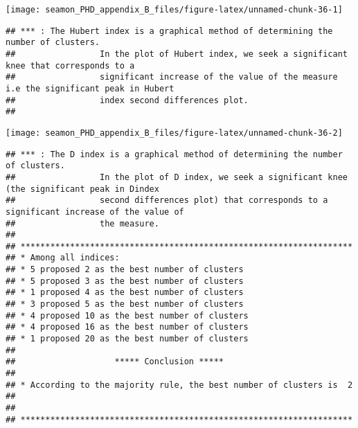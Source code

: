 \documentclass[]{article}
\newenvironment{Shaded}{\begin{snugshade}}{\end{snugshade}}
\newcommand{\CommentTok}[1]{\textcolor[rgb]{0.56,0.35,0.01}{\textit{#1}}}
\newcommand{\DataTypeTok}[1]{\textcolor[rgb]{0.13,0.29,0.53}{#1}}
\newcommand{\DecValTok}[1]{\textcolor[rgb]{0.00,0.00,0.81}{#1}}
\newcommand{\KeywordTok}[1]{\textcolor[rgb]{0.13,0.29,0.53}{\textbf{#1}}}
\newcommand{\NormalTok}[1]{#1}
\newcommand{\OperatorTok}[1]{\textcolor[rgb]{0.81,0.36,0.00}{\textbf{#1}}}
\newcommand{\OtherTok}[1]{\textcolor[rgb]{0.56,0.35,0.01}{#1}}
\newcommand{\StringTok}[1]{\textcolor[rgb]{0.31,0.60,0.02}{#1}}
\begin{document}
\begin{Shaded}
\end{Shaded}

\texttt{[image: seamon\_PHD\_appendix\_B\_files/figure-latex/unnamed-chunk-36-1]}

\begin{verbatim}
## *** : The Hubert index is a graphical method of determining the number of clusters.
##                 In the plot of Hubert index, we seek a significant knee that corresponds to a 
##                 significant increase of the value of the measure i.e the significant peak in Hubert
##                 index second differences plot. 
## 
\end{verbatim}

\texttt{[image: seamon\_PHD\_appendix\_B\_files/figure-latex/unnamed-chunk-36-2]}

\begin{verbatim}
## *** : The D index is a graphical method of determining the number of clusters. 
##                 In the plot of D index, we seek a significant knee (the significant peak in Dindex
##                 second differences plot) that corresponds to a significant increase of the value of
##                 the measure. 
##  
## ******************************************************************* 
## * Among all indices:                                                
## * 5 proposed 2 as the best number of clusters 
## * 5 proposed 3 as the best number of clusters 
## * 1 proposed 4 as the best number of clusters 
## * 3 proposed 5 as the best number of clusters 
## * 4 proposed 10 as the best number of clusters 
## * 4 proposed 16 as the best number of clusters 
## * 1 proposed 20 as the best number of clusters 
## 
##                    ***** Conclusion *****                            
##  
## * According to the majority rule, the best number of clusters is  2 
##  
##  
## *******************************************************************
\end{verbatim}
\end{document}
